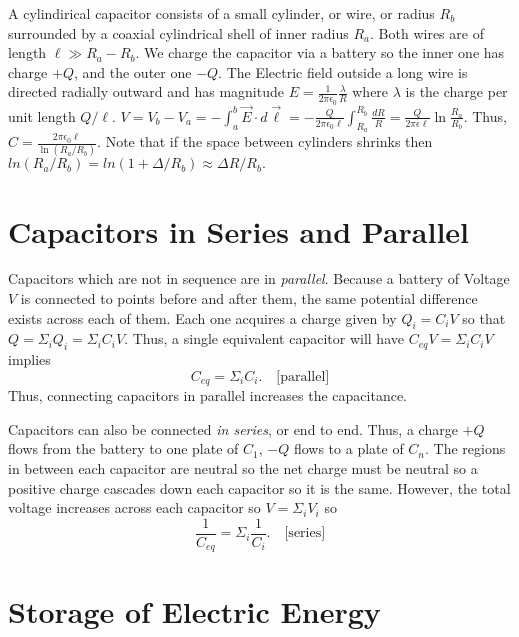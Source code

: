 \begin{example}
    A cylindirical capacitor consists of a small cylinder, or wire, or radius $R_b$ surrounded by a coaxial cylindrical shell of inner radius $R_a$. Both wires are of length $\ell \gg R_a - R_b$. We charge the capacitor via a battery so the inner one has charge $+Q$, and the outer one $-Q$. The Electric field outside a long wire is directed radially outward and has magnitude $E = \frac{1}{2\pi\epsilon_0}\frac{\lambda}{R}$ where $\lambda$ is the charge per unit length $Q/\ell$. $V = V_b - V_a = -\int_a^b \vec{E}\cdot d\vec{\ell} = -\frac{Q}{2\pi\epsilon_0\ell}\int_{R_a}^{R_b}\frac{dR}{R} = \frac{Q}{2\pi\epsilon\ell}\ln\frac{R_a}{R_b}.$ Thus, $C = \frac{2\pi\epsilon_0\ell}{\ln(R_a/R_b)}.$ Note that if the space between cylinders shrinks then $ln(R_a/R_b) = ln(1 + \Delta/R_b) \approx \Delta R/R_b.$
\end{example}

\section{Capacitors in Series and Parallel}

\begin{definition}
    Capacitors which are not in sequence are in \emph{parallel}. Because a battery of Voltage $V$ is connected to points before and after them, the same potential difference exists across each of them. Each one acquires a charge given by $Q_i = C_iV$ so that $Q = \Sigma_iQ_i = \Sigma_iC_iV$. Thus, a single equivalent capacitor will have $C_{eq}V = \Sigma_iC_iV$ implies  $$C_{eq} = \Sigma_i C_i. \quad\text{[parallel]}$$Thus, connecting capacitors in parallel increases the capacitance.
\end{definition}
\begin{definition}
    Capacitors can also be connected \emph{in series}, or end to end. Thus, a charge $+Q$ flows from the battery to one plate of $C_1$, $-Q$ flows to a plate of $C_n$. The regions in between each capacitor are neutral so the net charge must be neutral so a positive charge cascades down each capacitor so it is the same. However, the total voltage increases across each capacitor so $V=\Sigma_iV_i$ so $$\frac{1}{C_{eq}} = \Sigma_i\frac{1}{C_i}.\quad\text{[series]}$$
\end{definition}

\section{Storage of Electric Energy}

